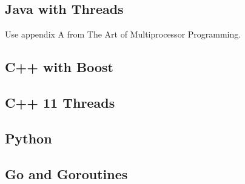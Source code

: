 \documentclass[11pt]{article} %
\begin{document}


\subsection{Java with Threads}
Use appendix A from The Art of Multiprocessor Programming.
\subsection{C++ with Boost}
\subsection{C++ 11 Threads}
\subsection{Python}
\subsection{Go and Goroutines}


\end{document}
